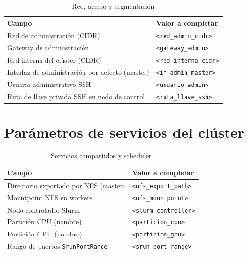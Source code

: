 \begin{table}[H]
\centering
\small
\caption{Red, acceso y segmentación}
\label{tab:parametros_red_acceso}
\begin{tabular}{|p{4.5cm}|p{8.8cm}|}
\hline
\textbf{Campo} & \textbf{Valor a completar} \\
\hline
Red de administración (CIDR) & \texttt{\textless red\_admin\_cidr\textgreater} \\
\hline
Gateway de administración & \texttt{\textless gateway\_admin\textgreater} \\
\hline
Red interna del clúster (CIDR) & \texttt{\textless red\_interna\_cidr\textgreater} \\
\hline
Interfaz de administración por defecto (master) & \texttt{\textless if\_admin\_master\textgreater} \\
\hline
Usuario administrativo SSH & \texttt{\textless usuario\_admin\textgreater} \\
\hline
Ruta de llave privada SSH en nodo de control & \texttt{\textless ruta\_llave\_ssh\textgreater} \\
\hline
\end{tabular}
\end{table}

\section{Parámetros de servicios del clúster}

\begin{table}[H]
\centering
\small
\caption{Servicios compartidos y scheduler}
\label{tab:parametros_servicios}
\begin{tabular}{|p{4.5cm}|p{8.8cm}|}
\hline
\textbf{Campo} & \textbf{Valor a completar} \\
\hline
Directorio exportado por NFS (master) & \texttt{\textless nfs\_export\_path\textgreater} \\
\hline
Mountpoint NFS en workers & \texttt{\textless nfs\_mountpoint\textgreater} \\
\hline
Nodo controlador Slurm & \texttt{\textless slurm\_controller\textgreater} \\
\hline
Partición CPU (nombre) & \texttt{\textless particion\_cpu\textgreater} \\
\hline
Partición GPU (nombre) & \texttt{\textless particion\_gpu\textgreater} \\
\hline
Rango de puertos \texttt{SrunPortRange} & \texttt{\textless srun\_port\_range\textgreater} \\
\hline
\end{tabular}
\end{table}

